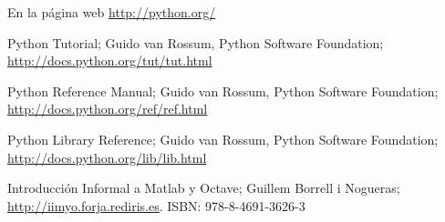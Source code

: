 \documentclass[a4paper,10pt]{article}
\begin{document}
En la página web \url{http://python.org/}


\begin{thebibliography}{99}

  Python Tutorial; Guido van Rossum, Python Software Foundation;
  \newblock \url{http://docs.python.org/tut/tut.html}

  Python Reference Manual; Guido van Rossum, Python Software Foundation;
  \newblock \url{http://docs.python.org/ref/ref.html}

  Python Library Reference; Guido van Rossum, Python Software Foundation;
  \newblock \url{http://docs.python.org/lib/lib.html}

  Introducción Informal a Matlab y Octave; Guillem Borrell i Nogueras;
  \newblock \url{http://iimyo.forja.rediris.es}. ISBN: 978-8-4691-3626-3

\end{thebibliography}
\end{document}
